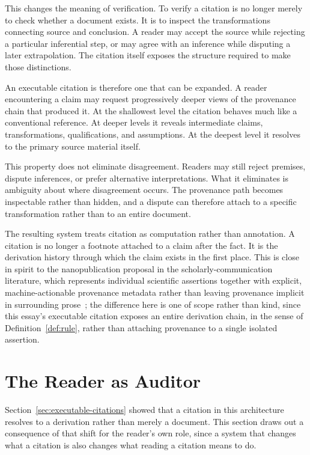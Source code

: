 \documentclass[11pt]{article}
\theoremstyle{definition}
\begin{document}
This changes the meaning of verification. To verify a citation is no longer merely to check whether a document exists. It is to inspect the transformations connecting source and conclusion. A reader may accept the source while rejecting a particular inferential step, or may agree with an inference while disputing a later extrapolation. The citation itself exposes the structure required to make those distinctions.

An executable citation is therefore one that can be expanded. A reader encountering a claim may request progressively deeper views of the provenance chain that produced it. At the shallowest level the citation behaves much like a conventional reference. At deeper levels it reveals intermediate claims, transformations, qualifications, and assumptions. At the deepest level it resolves to the primary source material itself.

This property does not eliminate disagreement. Readers may still reject premises, dispute inferences, or prefer alternative interpretations. What it eliminates is ambiguity about where disagreement occurs. The provenance path becomes inspectable rather than hidden, and a dispute can therefore attach to a specific transformation rather than to an entire document.

The resulting system treats citation as computation rather than annotation. A citation is no longer a footnote attached to a claim after the fact. It is the derivation history through which the claim exists in the first place. This is close in spirit to the nanopublication proposal in the scholarly-communication literature, which represents individual scientific assertions together with explicit, machine-actionable provenance metadata rather than leaving provenance implicit in surrounding prose~\cite{groth2010}; the difference here is one of scope rather than kind, since this essay's executable citation exposes an entire derivation chain, in the sense of Definition~\ref{def:rule}, rather than attaching provenance to a single isolated assertion.

\section{The Reader as Auditor}
\label{sec:reader-auditor}

Section~\ref{sec:executable-citations} showed that a citation in this architecture resolves to a derivation rather than merely a document. This section draws out a consequence of that shift for the reader's own role, since a system that changes what a citation is also changes what reading a citation means to do.
\end{document}
